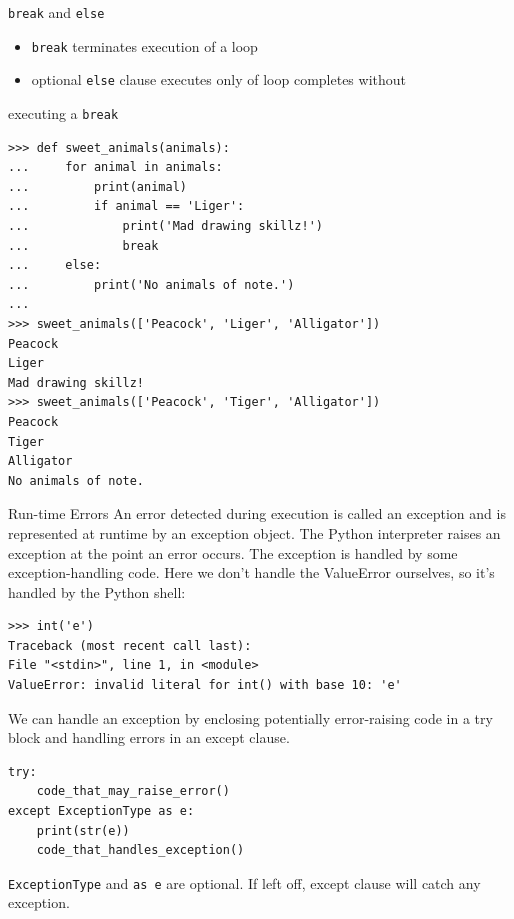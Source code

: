 \documentclass[smaller, aspectratio=1610]{beamer}
\begin{document}
\begin{frame}[label={sec:org24ada8a},fragile]{\texttt{break} and \texttt{else}}
 \begin{itemize}
\item \texttt{break} terminates execution of a loop
\item optional \texttt{else} clause executes only of loop completes without
\end{itemize}
executing a \texttt{break}

\lstset{language=Python,label= ,caption= ,captionpos=b,numbers=none}
\begin{lstlisting}
>>> def sweet_animals(animals):
...     for animal in animals:
...         print(animal)
...         if animal == 'Liger':
...             print('Mad drawing skillz!')
...             break
...     else:
...         print('No animals of note.')
...
>>> sweet_animals(['Peacock', 'Liger', 'Alligator'])
Peacock
Liger
Mad drawing skillz!
>>> sweet_animals(['Peacock', 'Tiger', 'Alligator'])
Peacock
Tiger
Alligator
No animals of note.
\end{lstlisting}
\end{frame}

\begin{frame}[label={sec:orga6e82ed},fragile]{Run-time Errors}
 An error detected during execution is called an exception and is represented at runtime by an exception object. The Python interpreter raises an exception at the point an error occurs. The exception is handled by some exception-handling code. Here we don't handle the ValueError ourselves, so it's handled by the Python shell:

\lstset{language=Python,label= ,caption= ,captionpos=b,numbers=none}
\begin{lstlisting}
>>> int('e')
Traceback (most recent call last):
File "<stdin>", line 1, in <module>
ValueError: invalid literal for int() with base 10: 'e'
\end{lstlisting}

We can handle an exception by enclosing potentially error-raising code
in a try block and handling errors in an except clause.

\lstset{language=Python,label= ,caption= ,captionpos=b,numbers=none}
\begin{lstlisting}
try:
    code_that_may_raise_error()
except ExceptionType as e:
    print(str(e))
    code_that_handles_exception()
\end{lstlisting}

\texttt{ExceptionType} and \texttt{as e} are optional. If left off, except clause will catch any
exception.
\end{frame}
\end{document}
